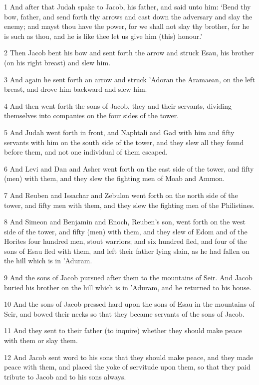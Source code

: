 \par 1 And after that Judah spake to Jacob, his father, and said unto him: ‘Bend thy bow, father, and send forth thy arrows and cast down the adversary and slay the enemy; and mayst thou have the power, for we shall not slay thy brother, for he is such as thou, and he is like thee let us give him (this) honour.’
\par 2 Then Jacob bent his bow and sent forth the arrow and struck Esau, his brother (on his right breast) and slew him.
\par 3 And again he sent forth an arrow and struck 'Adoran the Aramaean, on the left breast, and drove him backward and slew him.
\par 4 And then went forth the sons of Jacob, they and their servants, dividing themselves into companies on the four sides of the tower.
\par 5 And Judah went forth in front, and Naphtali and Gad with him and fifty servants with him on the south side of the tower, and they slew all they found before them, and not one individual of them escaped.
\par 6 And Levi and Dan and Asher went forth on the east side of the tower, and fifty (men) with them, and they slew the fighting men of Moab and Ammon.
\par 7 And Reuben and Issachar and Zebulon went forth on the north side of the tower, and fifty men with them, and they slew the fighting men of the Philistines.
\par 8 And Simeon and Benjamin and Enoch, Reuben's son, went forth on the west side of the tower, and fifty (men) with them, and they slew of Edom and of the Horites four hundred men, stout warriors; and six hundred fled, and four of the sons of Esau fled with them, and left their father lying slain, as he had fallen on the hill which is in 'Aduram.
\par 9 And the sons of Jacob pursued after them to the mountains of Seir. And Jacob buried his brother on the hill which is in 'Aduram, and he returned to his house.
\par 10 And the sons of Jacob pressed hard upon the sons of Esau in the mountains of Seir, and bowed their necks so that they became servants of the sons of Jacob.
\par 11 And they sent to their father (to inquire) whether they should make peace with them or slay them.
\par 12 And Jacob sent word to his sons that they should make peace, and they made peace with them, and placed the yoke of servitude upon them, so that they paid tribute to Jacob and to his sons always.
